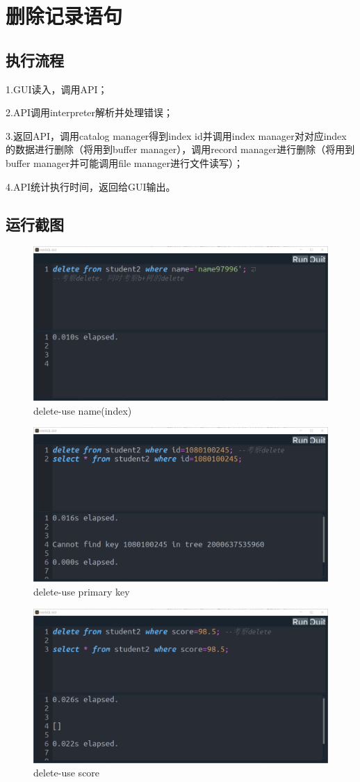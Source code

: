 \documentclass[UTF8]{ctexrep} %
\begin{document}
\section{删除记录语句}
\subsection{执行流程}
1.GUI读入，调用API；
\par
2.API调用interpreter解析并处理错误；
\par
3.返回API，调用catalog manager得到index id并调用index manager对对应index的数据进行删除（将用到buffer manager），调用record manager进行删除（将用到buffer manager并可能调用file manager进行文件读写）；
\par
4.API统计执行时间，返回给GUI输出。
\subsection{运行截图}
\begin{figure}[H]
    \centering
    \includegraphics[width=0.8\linewidth]{figure/7.1.png}
    \caption{delete-use name(index)}
    \label{fig:runtime7.1}
\end{figure}
\begin{figure}[H]
    \centering
    \includegraphics[width=0.8\linewidth]{figure/7.2.png}
    \caption{delete-use primary key}
    \label{fig:runtime7.2}
\end{figure}
\begin{figure}[H]
    \centering
    \includegraphics[width=0.8\linewidth]{figure/7.3.png}
    \caption{delete-use score}
    \label{fig:runtime7.3}
\end{figure}
\end{document}
